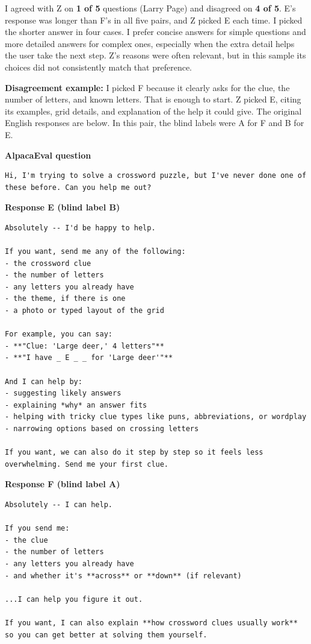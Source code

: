\begin{answer}
I agreed with Z on \textbf{1 of 5} questions (Larry Page) and disagreed on
\textbf{4 of 5}. E's response was longer than F's in all five pairs, and Z
picked E each time. I picked the shorter answer in four cases. I prefer
concise answers for simple questions and more detailed answers for complex
ones, especially when the extra detail helps the user take the next step.
Z's reasons were often relevant, but in this sample its choices did not
consistently match that preference.

\smallskip
\textbf{Disagreement example:} I picked F because it clearly asks for the
clue, the number of letters, and known letters. That is enough to start.
Z picked E, citing its examples, grid details, and explanation of the help
it could give. The original English responses are below. In this pair, the
blind labels were A for F and B for E.
\end{answer}

\medskip
\noindent\textbf{AlpacaEval question}\par
\begin{lstlisting}[language={},basicstyle=\small\ttfamily,breaklines=true,frame=none]
Hi, I'm trying to solve a crossword puzzle, but I've never done one of these before. Can you help me out?
\end{lstlisting}

\medskip
\noindent\textbf{Response E (blind label B)}\par
\begin{lstlisting}[language={},basicstyle=\small\ttfamily,breaklines=true,frame=none]
Absolutely -- I'd be happy to help.

If you want, send me any of the following:
- the crossword clue
- the number of letters
- any letters you already have
- the theme, if there is one
- a photo or typed layout of the grid

For example, you can say:
- **"Clue: 'Large deer,' 4 letters"**
- **"I have _ E _ _ for 'Large deer'"**

And I can help by:
- suggesting likely answers
- explaining *why* an answer fits
- helping with tricky clue types like puns, abbreviations, or wordplay
- narrowing options based on crossing letters

If you want, we can also do it step by step so it feels less overwhelming. Send me your first clue.
\end{lstlisting}

\medskip
\noindent\textbf{Response F (blind label A)}\par
\begin{lstlisting}[language={},basicstyle=\small\ttfamily,breaklines=true,frame=none]
Absolutely -- I can help.

If you send me:
- the clue
- the number of letters
- any letters you already have
- and whether it's **across** or **down** (if relevant)

...I can help you figure it out.

If you want, I can also explain **how crossword clues usually work** so you can get better at solving them yourself.
\end{lstlisting}

